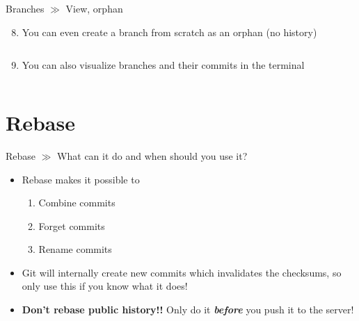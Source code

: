\documentclass[10pt]{beamer}
\begin{document}
\begin{frame}{Branches $\gg$ View, orphan}
	\begin{enumerate}\setcounter{enumi}{7}
		\item You can even create a branch from scratch as an orphan (no history)
		\inputminted[bgcolor=lightGreyCustom,fontsize=\scriptsize]{sh}{./resources/git_branches_08_orphan.sh}
		\item You can also visualize branches and their commits in the terminal
		\inputminted[bgcolor=lightGreyCustom,fontsize=\scriptsize]{sh}{./resources/git_branches_09_log.sh}
	\end{enumerate}
\end{frame}

\section{Rebase}

\begin{frame}{Rebase $\gg$ What can it do and when should you use it?}
	\begin{itemize}
		\item Rebase makes it possible to
		\begin{enumerate}
			\item Combine commits
			\item Forget commits
			\item Rename commits
		\end{enumerate}
		\item Git will internally create new commits which invalidates the checksums, so only use this if you know what it does!
		\item \textbf{Don't rebase public history!!} Only do it \textbf{\textit{before}} you push it to the server!
	\end{itemize}
\end{frame}
\end{document}
